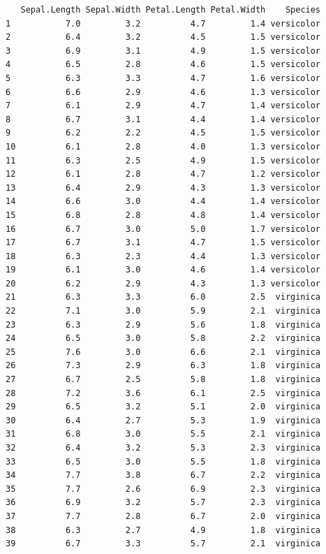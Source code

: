 \documentclass[
  a4paper,
]{ltjsbook}
\begin{document}
\begin{verbatim}
   Sepal.Length Sepal.Width Petal.Length Petal.Width    Species
1           7.0         3.2          4.7         1.4 versicolor
2           6.4         3.2          4.5         1.5 versicolor
3           6.9         3.1          4.9         1.5 versicolor
4           6.5         2.8          4.6         1.5 versicolor
5           6.3         3.3          4.7         1.6 versicolor
6           6.6         2.9          4.6         1.3 versicolor
7           6.1         2.9          4.7         1.4 versicolor
8           6.7         3.1          4.4         1.4 versicolor
9           6.2         2.2          4.5         1.5 versicolor
10          6.1         2.8          4.0         1.3 versicolor
11          6.3         2.5          4.9         1.5 versicolor
12          6.1         2.8          4.7         1.2 versicolor
13          6.4         2.9          4.3         1.3 versicolor
14          6.6         3.0          4.4         1.4 versicolor
15          6.8         2.8          4.8         1.4 versicolor
16          6.7         3.0          5.0         1.7 versicolor
17          6.7         3.1          4.7         1.5 versicolor
18          6.3         2.3          4.4         1.3 versicolor
19          6.1         3.0          4.6         1.4 versicolor
20          6.2         2.9          4.3         1.3 versicolor
21          6.3         3.3          6.0         2.5  virginica
22          7.1         3.0          5.9         2.1  virginica
23          6.3         2.9          5.6         1.8  virginica
24          6.5         3.0          5.8         2.2  virginica
25          7.6         3.0          6.6         2.1  virginica
26          7.3         2.9          6.3         1.8  virginica
27          6.7         2.5          5.8         1.8  virginica
28          7.2         3.6          6.1         2.5  virginica
29          6.5         3.2          5.1         2.0  virginica
30          6.4         2.7          5.3         1.9  virginica
31          6.8         3.0          5.5         2.1  virginica
32          6.4         3.2          5.3         2.3  virginica
33          6.5         3.0          5.5         1.8  virginica
34          7.7         3.8          6.7         2.2  virginica
35          7.7         2.6          6.9         2.3  virginica
36          6.9         3.2          5.7         2.3  virginica
37          7.7         2.8          6.7         2.0  virginica
38          6.3         2.7          4.9         1.8  virginica
39          6.7         3.3          5.7         2.1  virginica

\end{verbatim}
\end{document}
